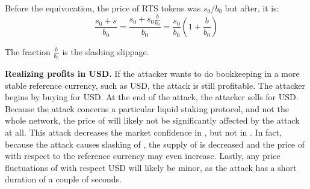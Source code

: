 Before the equivocation, the price of RTS tokens was $s_0/b_0$ but
after, it is:
\[
\frac{s_0 + s}{b_0} =
\frac{s_0 + s_0\frac{b}{b_0}}{b_0} =
\frac{s_0}{b_0} (1 + \frac{b}{b_0})
\]

The fraction $\frac{b}{b_0}$ is the slashing slippage.

\noindent
\textbf{Realizing profits in USD.}
If the attacker wants to do bookkeeping in a more stable reference currency,
such as USD, the attack is still profitable. The attacker begins by buying
\asset for USD. At the end of the attack, the attacker sells \asset for USD.
Because the attack concerns a particular liquid staking protocol, and
not the whole \asset network, the price of \asset will likely not
be significantly affected by the attack at all.
This attack decreases the market confidence in \stasset,
but not in \asset.
In fact, because
the attack causes slashing of \asset, the supply of \asset is decreased
and the price of \asset with respect to the reference currency may
even increase. 
Lastly, any price fluctuations of \asset with respect USD will likely be
minor, as the attack has a short duration of a couple of seconds.